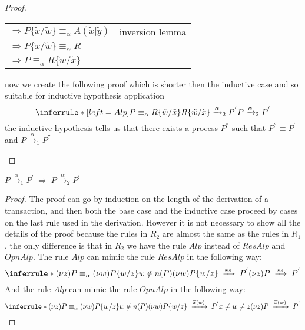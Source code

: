 \begin{theorem}
\begin{proof}
\begin{description}
\begin{description}
\begin{center}
\begin{tabular}{ll}
		  $\Rightarrow P\{\tilde{x}/\tilde{w}\}\equiv_{\alpha}A(\tilde{x}|\tilde{y})$  & inversion lemma
		\\
		  $\Rightarrow P\{\tilde{x}/\tilde{w}\}\equiv_{\alpha}R$ & 
		\\
		  $\Rightarrow P\equiv_{\alpha}R\{\tilde{w}/\tilde{x}\}$ & 
	      \end{tabular}
	    \end{center}
	    now we create the following proof which is shorter then the inductive case and so suitable for inductive hypothesis application
	    \[
		  \inferrule* [left=Alp]{
		      P\equiv_{\alpha}R\{\tilde{w}/\tilde{x}\}
		    \\
		      R\{\tilde{w}/\tilde{x}\}\xrightarrow{\alpha}_{2}P^{'}
		  }{
		    P\xrightarrow{\alpha}_{2}P^{'}
		  }	      
	    \]
	    the inductive hypothesis tells us that there exists a process $P^{''}$ such that $P^{''}\equiv P^{'}$ and $P\xrightarrow{\alpha}_{1}P^{''}$
	\end{description}
    \end{description}
  \end{proof}
\end{theorem}



\begin{theorem}
  $P\xrightarrow{\alpha}_{1}P^{'}\; \Rightarrow\; P\xrightarrow{\alpha}_{2}P^{'}$
  \begin{proof}
    The proof can go by induction on the length of the derivation of a transaction, and then both the base case and the inductive case proceed by cases on the last rule used in the derivation. However it is not necessary to show all the details of the proof because the rules in $R_{2}$ are almost the same as the rules in $R_{1}$, the only difference is that in $R_{2}$ we have the rule $Alp$ instead of $ResAlp$ and $OpnAlp$. The rule $Alp$ can mimic the rule $ResAlp$ in the following way:
	\[
	  \inferrule *{
	      (\nu z)P\equiv_{\alpha} (\nu w)P\{w/z\}
	    \\
	      w\notin n(P)
	    \\
	      (\nu w)P\{w/z\}\;
		\xrightarrow{xz}\;
		  P^{'}
	  }{
	    (\nu z)P\; 
	      \xrightarrow{xz}\;
		P^{'}
	  }
	\]
	And the rule $Alp$ can mimic the rule $OpnAlp$ in the following way:
	\[
	  \inferrule *{
	      (\nu z)P\equiv_{\alpha} (\nu w)P\{w/z\}
	    \\
	      w\notin n(P)
	    \\
	      (\nu w)P\{w/z\}\;
		\xrightarrow{\overline{x}(w)}\;
		  P^{'}
	    \\
	      x\neq w\neq z
	  }{
	    (\nu z)P\; 
	      \xrightarrow{\overline{x}(w)}\;
		P^{'}
	  }
	\]
  \end{proof}
\end{theorem}


